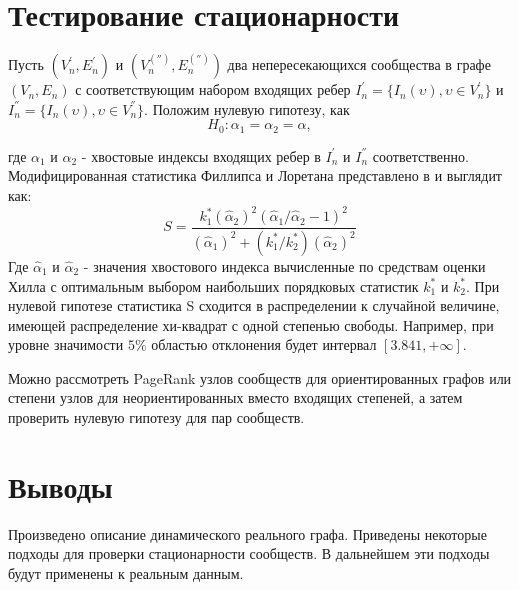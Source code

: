\documentclass[a4paper,12pt]{article}
\begin{document}
\section{Тестирование стационарности}
Пусть $(V^{'}_{n}, E^{'}_{n})$ и $(V^{('')}_{n}, E^{('')}_{n})$ два непересекающихся сообщества в графе $(V_{n}, E_{n})$ с соответствующим набором входящих ребер $I^{'}_{n} = \lbrace{I}_{n}(\upsilon), \upsilon \in V^{'}_{n}\rbrace$ и $I^{''}_{n} = \lbrace{I}_{n}(\upsilon), \upsilon \in V^{''}_{n}\rbrace$.
Положим нулевую гипотезу, как
\begin{equation}\label{F1}
H_{0}: \alpha_{1} = \alpha_{2} = \alpha,
\end{equation}

где $\alpha_{1}$ и $\alpha_{2}$ - хвостовые индексы входящих ребер в $I^{'}_{n}$ и $I^{''}_{n}$ соответственно. Модифицированная статистика Филлипса и Лоретана представлено в \cite{book12} и выглядит как:
\begin{equation}\label{F2}
S = \dfrac{k^{*}_{1} (\hat{\alpha}_{2})^{2}(\hat{\alpha}_{1}/\hat{\alpha}_{2}-1)^{2}}{(\hat{\alpha}_{1})^{2} + (k^{*}_1 / k^{*}_2)(\hat{\alpha}_{2})^{2}}
\end{equation}
Где $\hat{\alpha}_{1}$ и $\hat{\alpha}_{2}$ - значения хвостового индекса вычисленные по средствам оценки Хилла с оптимальным выбором наибольших порядковых статистик $k^{*}_{1}$ и $k^{*}_{2}$. 
При нулевой гипотезе статистика S сходится в распределении к случайной величине, имеющей распределение хи-квадрат с одной степенью свободы. Например, при уровне значимости $ 5\% $ областью отклонения будет интервал $[ 3.841, +\infty] $.	

Можно рассмотреть PageRank узлов сообществ для ориентированных графов или степени узлов для неориентированных вместо входящих степеней, а затем проверить нулевую гипотезу для пар сообществ.	
		
\section{Выводы}
	Произведено описание динамического реального графа. Приведены некоторые подходы для проверки стационарности сообществ. В дальнейшем эти подходы будут применены к реальным данным.


\newpage
 
\end{document}
